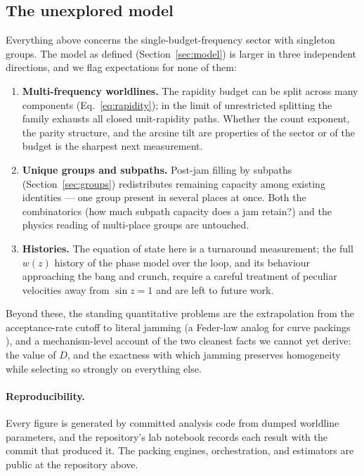 \documentclass[11pt]{article}
\begin{document}
\subsection{The unexplored model}

Everything above concerns the single-budget-frequency sector with singleton
groups. The model as defined (Section~\ref{sec:model}) is larger in three
independent directions, and we flag expectations for none of them:

\begin{enumerate}
  \item \textbf{Multi-frequency worldlines.} The rapidity budget can be
        split across many components (Eq.~\eqref{eq:rapidity}); in the limit
        of unrestricted splitting the family exhausts all closed
        unit-rapidity paths. Whether the count exponent, the parity
        structure, and the arcsine tilt are properties of the sector or of
        the budget is the sharpest next measurement.
  \item \textbf{Unique groups and subpaths.} Post-jam filling by subpaths
        (Section~\ref{sec:groups}) redistributes remaining capacity among
        existing identities --- one group present in several places at once.
        Both the combinatorics (how much subpath capacity does a jam retain?)
        and the physics reading of multi-place groups are untouched.
  \item \textbf{Histories.} The equation of state here is a turnaround
        measurement; the full $w(z)$ history of the phase model over the
        loop, and its behaviour approaching the bang and crunch, require a
        careful treatment of peculiar velocities away from $\sin z = 1$ and
        are left to future work.
\end{enumerate}

Beyond these, the standing quantitative problems are the extrapolation from
the acceptance-rate cutoff to literal jamming (a Feder-law analog for curve
packings \cite{evans}), and a mechanism-level account of the two cleanest
facts we cannot yet derive: the value of $D$, and the exactness with which
jamming preserves homogeneity while selecting so strongly on everything
else.

\paragraph{Reproducibility.} Every figure is generated by committed analysis
code from dumped worldline parameters, and the repository's lab notebook
records each result with the commit that produced it. The packing engines,
orchestration, and estimators are public at the repository above.
\end{document}
